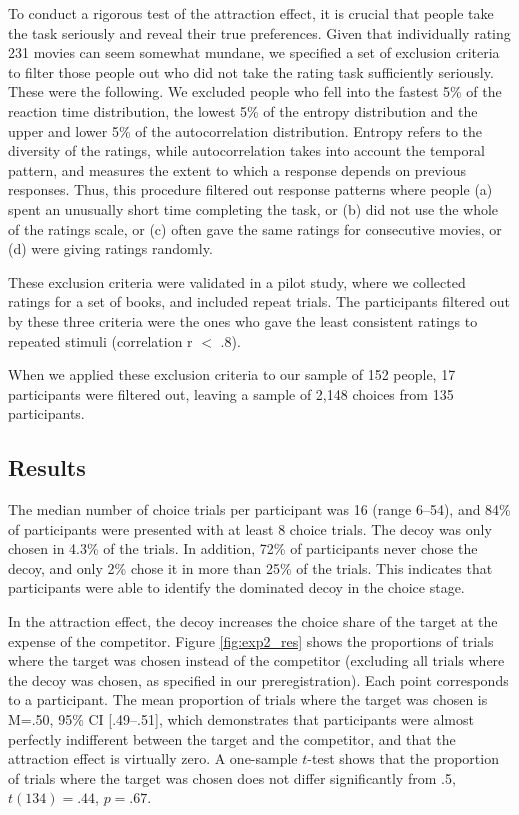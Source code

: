 \documentclass[12pt, a4paper]{article}
\begin{document}
To conduct a rigorous test of the attraction effect, it is crucial that people take the task seriously and reveal their true preferences. Given that individually rating 231 movies can seem somewhat mundane, we specified a set of exclusion criteria to filter those people out who did not take the rating task sufficiently seriously. These were the following. We excluded people who fell into the fastest 5\% of the reaction time distribution, the lowest 5\% of the entropy distribution and the upper and lower 5\% of the autocorrelation distribution. Entropy refers to the diversity of the ratings, while autocorrelation takes into account the temporal pattern, and measures the extent to which a response depends on previous responses. Thus, this procedure filtered out response patterns where people (a) spent an unusually short time completing the task, or (b) did not use the whole of the ratings scale, or (c) often gave the same ratings for consecutive movies, or (d) were giving ratings randomly.

These exclusion criteria were validated in a pilot study, where we collected ratings for a set of books, and included repeat trials. The participants filtered out by these three criteria were the ones who gave the least consistent ratings to repeated stimuli (correlation r $<$ .8).

When we applied these exclusion criteria to our sample of 152 people, 17 participants were filtered out, leaving a sample of 2,148 choices from 135 participants.


\subsection*{Results}

The median number of choice trials per participant was 16 (range 6--54), and 84\% of participants were presented with at least 8 choice trials. The decoy was only chosen in 4.3\% of the trials. In addition, 72\% of participants never chose the decoy, and only 2\% chose it in more than 25\% of the trials. This indicates that participants were able to identify the dominated decoy in the choice stage.

In the attraction effect, the decoy increases the choice share of the target at the expense of the competitor. Figure \ref{fig:exp2_res} shows the proportions of trials where the target was chosen instead of the competitor (excluding all trials where the decoy was chosen, as specified in our preregistration). Each point corresponds to a participant. The mean proportion of trials where the target was chosen is M=.50, 95\% CI [.49--.51], which demonstrates that participants were almost perfectly indifferent between the target and the competitor, and that the attraction effect is virtually zero. A one-sample $t$-test shows that the proportion of trials where the target was chosen does not differ significantly from .5, $t(134)=.44$, $p=.67$.
\end{document}
